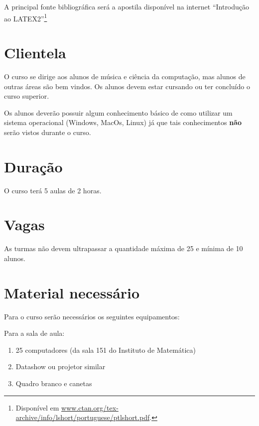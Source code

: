 \documentclass[12pt,brazil]{article}
\begin{document}
A principal fonte bibliográfica será a apostila disponível na internet
``Introdução ao LATEX2''\footnote{Disponível em
  \url{www.ctan.org/tex-archive/info/lshort/portuguese/ptlshort.pdf}.}


\section{Clientela}
O curso se dirige aos alunos de música e ciência da computação, mas
alunos de outras áreas são bem vindos. Os alunos devem estar cursando
ou ter concluído o curso superior.
  
Os alunos deverão possuir algum conhecimento básico de como utilizar
um sistema operacional (Windows, MacOs, Linux) já que tais
conhecimentos \textbf{não} serão vistos durante o curso.

\section{Duração}

O curso terá 5 aulas de 2 horas.
 
\section{Vagas}

As turmas não devem ultrapassar a quantidade máxima de 25 e mínima de
10 alunos.

\section{Material necessário}
\label{sec:material}

Para o curso serão necessários os seguintes equipamentos:

Para a sala de aula:
\begin{enumerate}
\item 25 computadores (da sala 151 do Instituto de Matemática)
\item Datashow ou projetor similar
\item Quadro branco e canetas
\end{enumerate}
\end{document}
